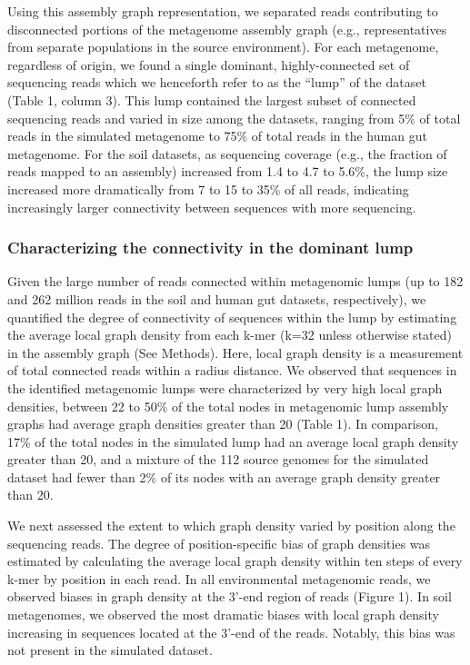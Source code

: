 \documentclass[10pt]{article}
\begin{document}
Using this assembly graph representation, we separated reads contributing to disconnected portions of the metagenome assembly graph (e.g., representatives from separate populations in the source environment).  For each metagenome, regardless of origin, we found a single dominant, highly-connected set of sequencing reads which we henceforth refer to as the  ``lump''  of the dataset (Table 1, column 3).  This lump contained the largest subset of connected sequencing reads and varied in size among the datasets, ranging from 5\% of total reads in the simulated metagenome to 75\% of total reads in the human gut metagenome.  For the soil datasets, as sequencing coverage (e.g., the fraction of reads mapped to an assembly) increased from 1.4 to 4.7 to 5.6\%, the lump size increased more dramatically from 7 to 15 to 35\% of all reads, indicating increasingly larger connectivity between sequences with more sequencing.

\subsubsection*{Characterizing the connectivity in the dominant lump}

Given the large number of reads connected within metagenomic lumps (up to 182 and 262 million reads in the soil and human gut datasets, respectively), we quantified the degree of connectivity of sequences within the lump by estimating the average local graph density from each k-mer (k=32 unless otherwise stated) in the assembly graph (See Methods).  Here, local graph density is a measurement of total connected reads within a radius distance.  We observed that sequences in the identified metagenomic lumps were characterized by very high local graph densities, between 22 to 50\% of the total nodes in metagenomic lump assembly graphs had average graph densities greater than 20 (Table 1).  In comparison, 17\% of the total nodes in the simulated lump had an average local graph density greater than 20, and a mixture of the 112 source genomes for the simulated dataset had fewer than 2\% of its nodes with an average graph density greater than 20.  

We next assessed the extent to which graph density varied by position along the sequencing reads.  The degree of position-specific bias of graph densities was estimated by calculating the average local graph density within ten steps of every k-mer by position in each read.  In all environmental metagenomic reads, we observed biases in graph density at the 3'-end region of reads (Figure 1).  In soil metagenomes, we observed the most dramatic biases with local graph density increasing in sequences located at the 3'-end of the reads.  Notably, this bias was not present in the simulated dataset.  
\end{document}
